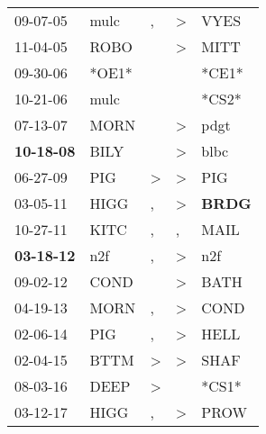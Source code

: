 \begin{supertabular}{p{0.07\textwidth}p{0.06\textwidth}p{0.02\textwidth}p{0.02\textwidth}p{0.06\textwidth}}
          09-07-05\textsuperscript{} &          mulc\textsuperscript{} &             , &     \textgreater &           VYES\textsuperscript{} \\
          11-04-05\textsuperscript{} &          ROBO\textsuperscript{} &               &     \textgreater &           MITT\textsuperscript{} \\
          09-30-06\textsuperscript{} &                           *OE1* &               &                  &                            *CE1* \\
          10-21-06\textsuperscript{} &          mulc\textsuperscript{} &               &                  &                            *CS2* \\
          07-13-07\textsuperscript{} &          MORN\textsuperscript{} &               &     \textgreater &           pdgt\textsuperscript{} \\
 \textbf{10-18-08\textsuperscript{}} &          BILY\textsuperscript{} &               &     \textgreater &           blbc\textsuperscript{} \\
          06-27-09\textsuperscript{} &           PIG\textsuperscript{} &  \textgreater &     \textgreater &            PIG\textsuperscript{} \\
          03-05-11\textsuperscript{} &          HIGG\textsuperscript{} &             , &     \textgreater &  \textbf{BRDG\textsuperscript{}} \\
          10-27-11\textsuperscript{} &          KITC\textsuperscript{} &             , &                , &           MAIL\textsuperscript{} \\
 \textbf{03-18-12\textsuperscript{}} &           n2f\textsuperscript{} &             , &     \textgreater &            n2f\textsuperscript{} \\
          09-02-12\textsuperscript{} &          COND\textsuperscript{} &               &     \textgreater &           BATH\textsuperscript{} \\
          04-19-13\textsuperscript{} &          MORN\textsuperscript{} &             , &     \textgreater &           COND\textsuperscript{} \\
          02-06-14\textsuperscript{} &           PIG\textsuperscript{} &             , &     \textgreater &           HELL\textsuperscript{} \\
          02-04-15\textsuperscript{} &          BTTM\textsuperscript{} &  \textgreater &     \textgreater &           SHAF\textsuperscript{} \\
          08-03-16\textsuperscript{} &          DEEP\textsuperscript{} &  \textgreater &                  &                            *CS1* \\
          03-12-17\textsuperscript{} &          HIGG\textsuperscript{} &             , &     \textgreater &           PROW\textsuperscript{} \\
\end{supertabular}
